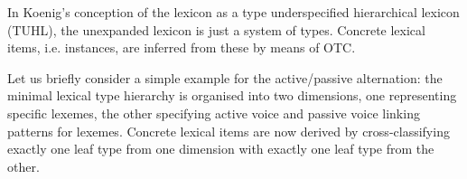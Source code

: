 \documentclass[output=paper
	        ,collection
	        ,collectionchapter
 	        ,biblatex
                ,babelshorthands
                ,newtxmath
                ,draftmode
                ,colorlinks, citecolor=brown
]{./langsci/langscibook}
\begin{document}
{In Koenig's conception of the lexicon as a type underspecified
hierarchical lexicon (TUHL), the unexpanded lexicon is just a system of
types. Concrete lexical items, i.e. instances, are inferred from these
by means of OTC. 

Let us briefly consider a simple example for the active/passive
alternation: the minimal lexical type hierarchy is organised into two
dimensions, one representing specific lexemes, the other specifying
active voice and passive voice linking patterns for lexemes. Concrete
lexical items are now derived by cross-classifying exactly one leaf
type from one dimension with exactly one leaf type from the other.

\begin{figure}[htb]
  \centering

  \footnotesize

\end{figure}}
\end{document}
